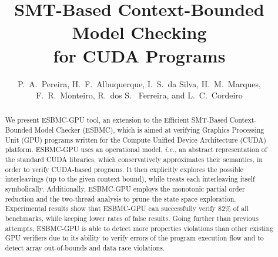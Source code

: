 \documentclass[times, doublespace]{cpeauth}
\begin{document}

\title{SMT-Based Context-Bounded Model Checking\\for CUDA Programs}

\author{P.~A.~Pereira, H.~F.~Albuquerque, I.~S.~da Silva, H.~M.~Marques, F.~R.~Monteiro, R.~dos S.~	Ferreira, and L.~C.~Cordeiro\corrauth}

\address{
Faculty of Technology, Federal University of Amazonas, Amazonas, Brazil\break
{}Department of Informatics, Federal University of Vi\c{c}osa, Minas Gerais, Brazil}


\begin{abstract}
We present ESBMC-GPU tool, an extension to the Efficient SMT-Based Context-Bounded Model Checker (ESBMC), which is aimed at verifying Graphics Processing Unit (GPU) programs written for the Compute Unified Device Architecture (CUDA) platform. ESBMC-GPU uses an operational model, {\it i.e.}, an abstract representation of the standard CUDA libraries, which conservatively approximates their semantics, in order to verify CUDA-based programs. It then explicitly explores the possible interleavings (up to the given context bound), while treats each interleaving itself symbolically. Additionally, ESBMC-GPU employs the monotonic partial order reduction and the two-thread analysis to prune the state space exploration. Experimental results show that ESBMC-GPU can successfully verify $82\%$ of all benchmarks, while keeping lower rates of false results. Going further than previous attempts, ESBMC-GPU is able to detect more properties violations than other existing GPU verifiers due to its ability to verify errors of the program execution flow and to detect array out-of-bounds and data race violations.
\end{abstract}


\maketitle
\end{document}
